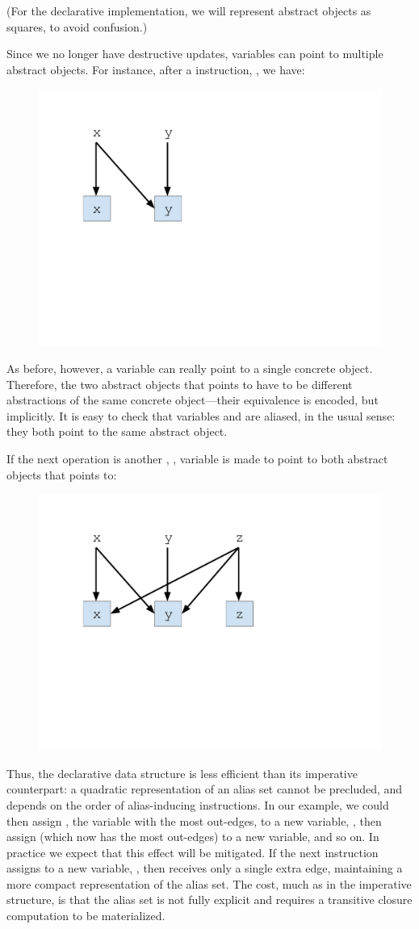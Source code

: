(For the declarative implementation, we will represent abstract objects as squares, to avoid confusion.)

Since we no longer have destructive updates, variables can point to multiple abstract objects. For instance, after a  instruction, , we have:

\begin{figure}[h]
\centering
\includegraphics[trim={30mm 90mm 140mm 25mm},clip,width=0.32\linewidth]{assets/must-data/decl-alias-graph1.pdf}
\end{figure}

As before, however, a variable can really point to a single concrete object. Therefore, the two abstract objects that  points to have to be different abstractions of the same concrete object---their equivalence is encoded, but implicitly. It is easy to check that variables  and  are aliased, in the usual sense: they both point to the same abstract object.

If the next operation is another , , variable  is made to point to both abstract objects that  points to:

\begin{figure}[h]
\centering
\includegraphics[trim={25mm 85mm 70mm 25mm},clip,width=0.6\linewidth]{assets/must-data/decl-alias-graph2.pdf}
\end{figure}

Thus, the declarative data structure is less efficient than its imperative counterpart: a quadratic representation of an alias set cannot be precluded, and depends on the order of alias-inducing instructions. In our example, we could then assign , the variable with the most out-edges, to a new variable, , then assign  (which now has the most out-edges) to a new variable, and so on. In practice we expect that this effect will be mitigated. If the next instruction assigns  to a new variable, , then  receives only a single extra edge, maintaining a more compact representation of the alias set. The cost, much as in the imperative structure, is that the alias set is not fully explicit and requires a transitive closure computation to be materialized.


